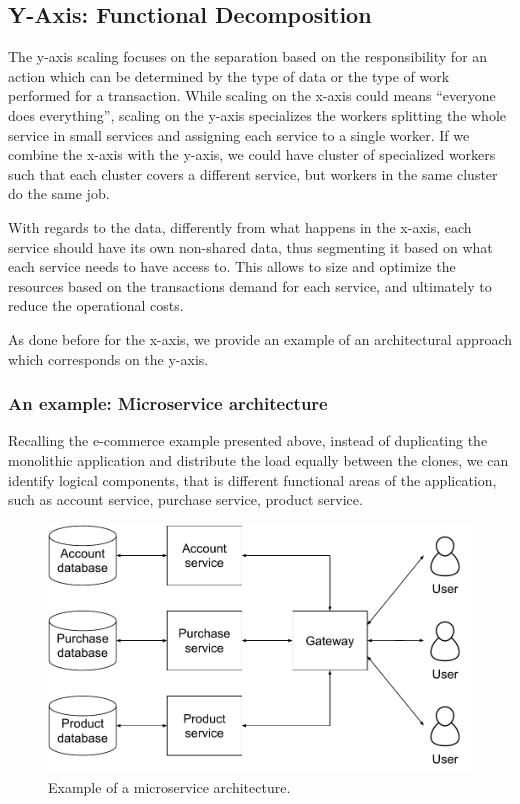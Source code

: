\subsection{Y-Axis: Functional Decomposition}
\label{sec:y-axis}
The y-axis scaling focuses on the separation based on the responsibility for an
action which can be determined by the type of data or the type of work performed
for a transaction. While scaling on the x-axis could means ``everyone does
everything'', scaling on the y-axis specializes the workers splitting the whole
service in small services and assigning each service to a single worker. If we
combine the x-axis with the y-axis, we could have cluster of specialized workers
such that each cluster covers a different service, but workers in the same
cluster do the same job.

With regards to the data, differently from what happens in the x-axis, each
service should have its own non-shared data, thus segmenting it based on what
each service needs to have access to. This allows to size and optimize the
resources based on the transactions demand for each service, and ultimately to
reduce the operational costs.

As done before for the x-axis, we provide an example of an architectural
approach which corresponds on the y-axis.

\subsubsection{An example: Microservice architecture}
Recalling the e-commerce example presented above, instead of duplicating the
monolithic application and distribute the load equally between the clones, we
can identify logical components, that is different functional areas of the
application, such as account service, purchase service, product service.

\begin{figure}
	\begin{center}
		\includegraphics[width=.7\textwidth]{./res/img/microservice-architecture.pdf}
	\end{center}
	\caption{Example of a microservice architecture.}
	\label{fig:microservice-architecture}
\end{figure}

